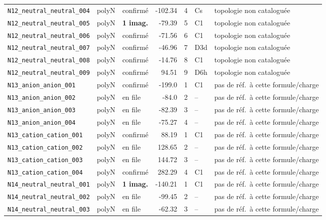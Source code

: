 \begin{longtable}{@{}p{4.2cm}cp{1.3cm}rrp{1.2cm}p{2.6cm}@{}}
\texttt{N12\_neutral\_neutral\_004} & polyN & confirm\'e & -102.34 & 4 & Cs & topologie non catalogu\'ee \\
\texttt{N12\_neutral\_neutral\_005} & polyN & \textbf{1 imag.} & -79.39 & 5 & C1 & topologie non catalogu\'ee \\
\texttt{N12\_neutral\_neutral\_006} & polyN & confirm\'e & -71.56 & 6 & C1 & topologie non catalogu\'ee \\
\texttt{N12\_neutral\_neutral\_007} & polyN & confirm\'e & -46.96 & 7 & D3d & topologie non catalogu\'ee \\
\texttt{N12\_neutral\_neutral\_008} & polyN & confirm\'e & -14.76 & 8 & C1 & topologie non catalogu\'ee \\
\texttt{N12\_neutral\_neutral\_009} & polyN & confirm\'e & 94.51 & 9 & D6h & topologie non catalogu\'ee \\
\addlinespace
\texttt{N13\_anion\_anion\_001} & polyN & confirm\'e & -199.0 & 1 & C1 & pas de r\'ef.\ \`a cette formule/charge \\
\texttt{N13\_anion\_anion\_002} & polyN & en file & -84.0 & 2 & -- & pas de r\'ef.\ \`a cette formule/charge \\
\texttt{N13\_anion\_anion\_003} & polyN & en file & -82.39 & 3 & -- & pas de r\'ef.\ \`a cette formule/charge \\
\texttt{N13\_anion\_anion\_004} & polyN & en file & -75.27 & 4 & -- & pas de r\'ef.\ \`a cette formule/charge \\
\addlinespace
\texttt{N13\_cation\_cation\_001} & polyN & confirm\'e & 88.19 & 1 & C1 & pas de r\'ef.\ \`a cette formule/charge \\
\texttt{N13\_cation\_cation\_002} & polyN & en file & 128.65 & 2 & -- & pas de r\'ef.\ \`a cette formule/charge \\
\texttt{N13\_cation\_cation\_003} & polyN & en file & 144.72 & 3 & -- & pas de r\'ef.\ \`a cette formule/charge \\
\texttt{N13\_cation\_cation\_004} & polyN & confirm\'e & 282.29 & 4 & C1 & pas de r\'ef.\ \`a cette formule/charge \\
\addlinespace
\texttt{N14\_neutral\_neutral\_001} & polyN & \textbf{1 imag.} & -140.21 & 1 & C1 & pas de r\'ef.\ \`a cette formule/charge \\
\texttt{N14\_neutral\_neutral\_002} & polyN & en file & -99.45 & 2 & -- & pas de r\'ef.\ \`a cette formule/charge \\
\texttt{N14\_neutral\_neutral\_003} & polyN & en file & -62.32 & 3 & -- & pas de r\'ef.\ \`a cette formule/charge \\

\end{longtable}
